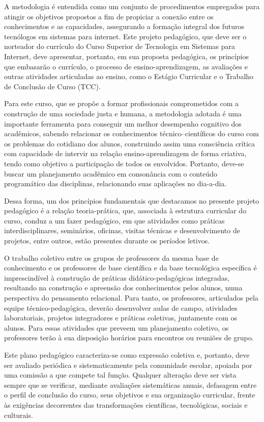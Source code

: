 A metodologia é entendida como um conjunto de procedimentos empregados para atingir os objetivos propostos a fim de propiciar a conexão entre os conhecimentos e as capacidades, assegurando a formação integral dos futuros tecnólogos em sistemas para internet. Este projeto pedagógico, que deve ser o norteador do currículo do Curso Superior de Tecnologia em Sistemas para Internet, deve apresentar, portanto, em sua proposta pedagógica, os princípios que embasarão o currículo, o processo de ensino-aprendizagem, as avaliações e outras atividades articuladas ao ensino, como o Estágio Curricular e o Trabalho de Conclusão de Curso (TCC).

Para este curso, que se propõe a formar profissionais comprometidos com a construção de uma sociedade justa e humana, a metodologia adotada é uma importante ferramenta para conseguir um melhor desempenho cognitivo dos acadêmicos, sabendo relacionar os conhecimentos técnico–científicos do curso com os problemas do cotidiano dos alunos, construindo assim uma consciência crítica com capacidade de intervir na relação ensino-aprendizagem de forma criativa, tendo como objetivo a participação de todos os envolvidos. Portanto, deve-se buscar um planejamento acadêmico em consonância com o conteúdo programático das disciplinas, relacionando suas aplicações no dia-a-dia.

Dessa forma, um dos princípios fundamentais que destacamos no presente projeto pedagógico é a relação teoria-prática, que, associada à estrutura curricular do curso, conduz a um fazer pedagógico, em que atividades como práticas interdisciplinares, seminários, oficinas, visitas técnicas e desenvolvimento de projetos, entre outros, estão presentes durante os períodos letivos.  

O trabalho coletivo entre os grupos de professores da mesma base de conhecimento e os professores de base científica e da base tecnológica específica é imprescindível à construção de práticas didático-pedagógicas integradas, resultando na construção e apreensão dos conhecimentos pelos alunos, numa perspectiva do pensamento relacional. Para tanto, os professores, articulados pela equipe técnico-pedagógica, deverão desenvolver aulas de campo, atividades laboratoriais, projetos integradores e práticas coletivas, juntamente com os alunos. Para essas atividades que preveem um planejamento coletivo, os professores terão à sua disposição horários para encontros ou reuniões de grupo.

Este plano pedagógico caracteriza-se como expressão coletiva e, portanto, deve ser avaliado periódica e sistematicamente pela comunidade escolar, apoiada por uma comissão a que compete tal função. Qualquer alteração deve ser vista sempre que se verificar, mediante avaliações sistemáticas anuais, defasagem entre o perfil de conclusão do curso, seus objetivos e sua organização curricular, frente às exigências decorrentes das transformações científicas, tecnológicas, sociais e culturais.

